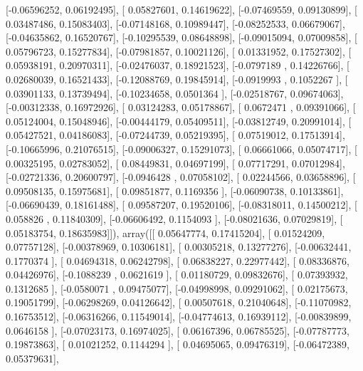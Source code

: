 \documentclass{article}
\begin{document}
       [-0.06596252,  0.06192495],
       [ 0.05827601,  0.14619622],
       [-0.07469559,  0.09130899],
       [ 0.03487486,  0.15083403],
       [-0.07148168,  0.10989447],
       [-0.08252533,  0.06679067],
       [-0.04635862,  0.16520767],
       [-0.10295539,  0.08648898],
       [-0.09015094,  0.07009858],
       [ 0.05796723,  0.15277834],
       [-0.07981857,  0.10021126],
       [ 0.01331952,  0.17527302],
       [ 0.05938191,  0.20970311],
       [-0.02476037,  0.18921523],
       [-0.0797189 ,  0.14226766],
       [ 0.02680039,  0.16521433],
       [-0.12088769,  0.19845914],
       [-0.0919993 ,  0.1052267 ],
       [ 0.03901133,  0.13739494],
       [-0.10234658,  0.0501364 ],
       [-0.02518767,  0.09674063],
       [-0.00312338,  0.16972926],
       [ 0.03124283,  0.05178867],
       [ 0.0672471 ,  0.09391066],
       [ 0.05124004,  0.15048946],
       [-0.00444179,  0.05409511],
       [-0.03812749,  0.20991014],
       [ 0.05427521,  0.04186083],
       [-0.07244739,  0.05219395],
       [ 0.07519012,  0.17513914],
       [-0.10665996,  0.21076515],
       [-0.09006327,  0.15291073],
       [ 0.06661066,  0.05074717],
       [ 0.00325195,  0.02783052],
       [ 0.08449831,  0.04697199],
       [ 0.07717291,  0.07012984],
       [-0.02721336,  0.20600797],
       [-0.0946428 ,  0.07058102],
       [ 0.02244566,  0.03658896],
       [ 0.09508135,  0.15975681],
       [ 0.09851877,  0.1169356 ],
       [-0.06090738,  0.10133861],
       [-0.06690439,  0.18161488],
       [ 0.09587207,  0.19520106],
       [-0.08318011,  0.14500212],
       [ 0.058826  ,  0.11840309],
       [-0.06606492,  0.1154093 ],
       [-0.08021636,  0.07029819],
       [ 0.05183754,  0.18635983]]), array([[ 0.05647774,  0.17415204],
       [ 0.01524209,  0.07757128],
       [-0.00378969,  0.10306181],
       [ 0.00305218,  0.13277276],
       [-0.00632441,  0.1770374 ],
       [ 0.04694318,  0.06242798],
       [ 0.06838227,  0.22977442],
       [ 0.08336876,  0.04426976],
       [-0.1088239 ,  0.0621619 ],
       [ 0.01180729,  0.09832676],
       [ 0.07393932,  0.1312685 ],
       [-0.0580071 ,  0.09475077],
       [-0.04998998,  0.09291062],
       [ 0.02175673,  0.19051799],
       [-0.06298269,  0.04126642],
       [ 0.00507618,  0.21040648],
       [-0.11070982,  0.16753512],
       [-0.06316266,  0.11549014],
       [-0.04774613,  0.16939112],
       [-0.00839899,  0.0646158 ],
       [-0.07023173,  0.16974025],
       [ 0.06167396,  0.06785525],
       [-0.07787773,  0.19873863],
       [ 0.01021252,  0.1144294 ],
       [ 0.04695065,  0.09476319],
       [-0.06472389,  0.05379631],
\end{document}
